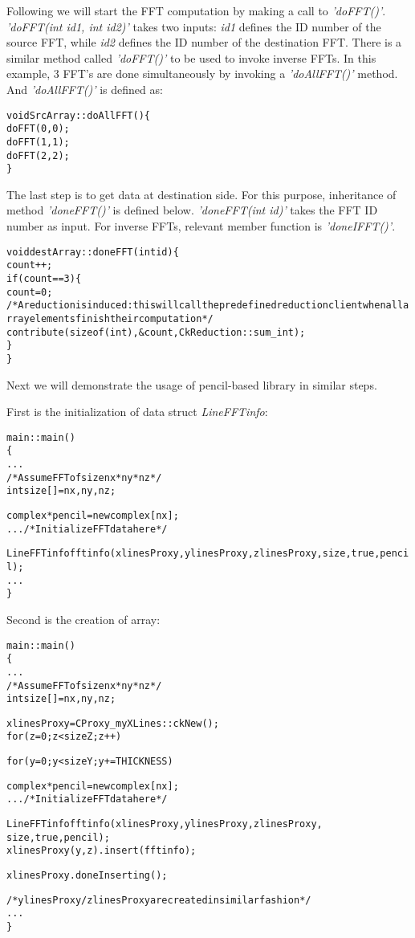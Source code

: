 Following we will start the FFT computation by making a call to {\it
'doFFT()'}. {\it 'doFFT(int id1, int id2)'} takes two inputs: {\it
id1} defines the ID number of the source FFT, while {\it id2} defines
the ID number of the destination FFT. There is a similar method called
{\it 'doFFT()'} to be used to invoke inverse FFTs. In this example, 3
FFT's are done simultaneously by invoking a {\it 'doAllFFT()'}
method. And {\it 'doAllFFT()'} is defined as:
\begin{alltt}
    void SrcArray::doAllFFT() \{
        doFFT(0, 0);
        doFFT(1, 1);
        doFFT(2, 2);
    \}
\end{alltt}

The last step is to get data at destination side. For this purpose,
inheritance of method {\it 'doneFFT()'} is defined below. {\it
'doneFFT(int id)'} takes the FFT ID number as input. For inverse FFTs,
relevant member function is {\it 'doneIFFT()'}.
\begin{alltt}
    void destArray::doneFFT(int id) \{
        count ++; 
        if(count==3) \{
            count = 0;
            /* A reduction is induced:  this will call the predefined reduction client when all array elements finish their computation */
            contribute(sizeof(int), &count, CkReduction::sum_int);
       \}
    \}
\end{alltt}

Next we will demonstrate the usage of pencil-based library in similar steps. 

First is the initialization of data struct {\it LineFFTinfo}:
\begin{alltt}
     main::main()  
    \{
         ...
         /* Assume FFT of size  nx*ny*nz */
         int size[] = {nx, ny, nz};

         complex *pencil =  new complex[nx];
         ... /* Initialize FFT data here */ 

         LineFFTinfo fftinfo(xlinesProxy, ylinesProxy, zlinesProxy, size, true, pencil);
         ...
     \}
\end{alltt}


Second is the creation of array:
\begin{alltt}
     main::main()    
    \{
         ...
         /* Assume FFT of size  nx*ny*nz */
         int size[] = {nx, ny, nz};

         xlinesProxy = CProxy_myXLines::ckNew();
         for (z = 0; z < sizeZ; z++) {
             for (y = 0; y < sizeY; y+=THICKNESS) {
                 complex *pencil =  new complex[nx];
                 ... /* Initialize FFT data here */

                 LineFFTinfo fftinfo(xlinesProxy, ylinesProxy, zlinesProxy, 
                                     size, true, pencil);
                 xlinesProxy(y, z).insert(fftinfo);
             }
         }
         xlinesProxy.doneInserting();

         /* ylinesProxy /zlinesProxy are created in similar fashion */
         ...
     \}
\end{alltt}

